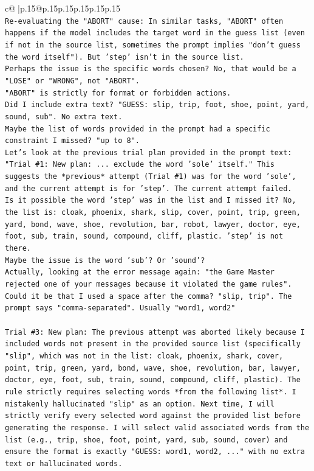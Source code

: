 \documentclass{article}
\begin{document}
{\begin{supertabular}{c@{$\;$}|p{.15\linewidth}@{}p{.15\linewidth}p{.15\linewidth}p{.15\linewidth}p{.15\linewidth}p{.15\linewidth}}
{{{\\ 
\texttt{Re{-}evaluating the "ABORT" cause: In similar tasks, "ABORT" often happens if the model includes the target word in the guess list (even if not in the source list, sometimes the prompt implies "don't guess the word itself"). But 'step' isn't in the source list.} \\
\texttt{Perhaps the issue is the specific words chosen? No, that would be a "LOSE" or "WRONG", not "ABORT".} \\
\texttt{"ABORT" is strictly for format or forbidden actions.} \\
\texttt{Did I include extra text? "GUESS: slip, trip, foot, shoe, point, yard, sound, sub". No extra text.} \\
\texttt{Maybe the list of words provided in the prompt had a specific constraint I missed? "up to 8".} \\
\texttt{Let's look at the previous trial plan provided in the prompt text: "Trial \#1: New plan: ... exclude the word 'sole' itself." This suggests the *previous* attempt (Trial \#1) was for the word 'sole', and the current attempt is for 'step'. The current attempt failed.} \\
\texttt{Is it possible the word 'step' was in the list and I missed it? No, the list is: cloak, phoenix, shark, slip, cover, point, trip, green, yard, bond, wave, shoe, revolution, bar, robot, lawyer, doctor, eye, foot, sub, train, sound, compound, cliff, plastic. 'step' is not there.} \\
\texttt{Maybe the issue is the word 'sub'? Or 'sound'?} \\
\texttt{Actually, looking at the error message again: "the Game Master rejected one of your messages because it violated the game rules".} \\
\texttt{Could it be that I used a space after the comma? "slip, trip". The prompt says "comma{-}separated". Usually "word1, word2"} \\
\\ 
\texttt{Trial \#3: New plan: The previous attempt was aborted likely because I included words not present in the provided source list (specifically "slip", which was not in the list: cloak, phoenix, shark, cover, point, trip, green, yard, bond, wave, shoe, revolution, bar, lawyer, doctor, eye, foot, sub, train, sound, compound, cliff, plastic). The rule strictly requires selecting words *from the following list*. I mistakenly hallucinated "slip" as an option. Next time, I will strictly verify every selected word against the provided list before generating the response. I will select valid associated words from the list (e.g., trip, shoe, foot, point, yard, sub, sound, cover) and ensure the format is exactly "GUESS: word1, word2, ..." with no extra text or hallucinated words.} \\
}}}
\end{supertabular}}
\end{document}
